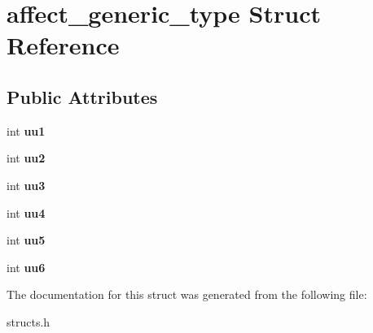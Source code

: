 \hypertarget{structaffect__generic__type}{\section{affect\-\_\-generic\-\_\-type Struct Reference}
\label{structaffect__generic__type}
}
\subsection*{Public Attributes}
\begin{DoxyCompactItemize}
\item 
\hypertarget{structaffect__generic__type_a29417f5ee3da60dc9ced6255371b75ea}{int {\bfseries uu1}}\label{structaffect__generic__type_a29417f5ee3da60dc9ced6255371b75ea}

\item 
\hypertarget{structaffect__generic__type_ae4950fdd58ea8c5e128059bd32a9cd21}{int {\bfseries uu2}}\label{structaffect__generic__type_ae4950fdd58ea8c5e128059bd32a9cd21}

\item 
\hypertarget{structaffect__generic__type_a9154b481d4ab7eafc8d0b26056b5160a}{int {\bfseries uu3}}\label{structaffect__generic__type_a9154b481d4ab7eafc8d0b26056b5160a}

\item 
\hypertarget{structaffect__generic__type_a48eea014b87c0a691b59f142134d48f9}{int {\bfseries uu4}}\label{structaffect__generic__type_a48eea014b87c0a691b59f142134d48f9}

\item 
\hypertarget{structaffect__generic__type_ae5ddf58b7ef69938b13f767a37387846}{int {\bfseries uu5}}\label{structaffect__generic__type_ae5ddf58b7ef69938b13f767a37387846}

\item 
\hypertarget{structaffect__generic__type_ab8f0e319c3bf6a92853fdce86ee5af68}{int {\bfseries uu6}}\label{structaffect__generic__type_ab8f0e319c3bf6a92853fdce86ee5af68}

\end{DoxyCompactItemize}


The documentation for this struct was generated from the following file\-:\begin{DoxyCompactItemize}
\item 
structs.\-h\end{DoxyCompactItemize}
